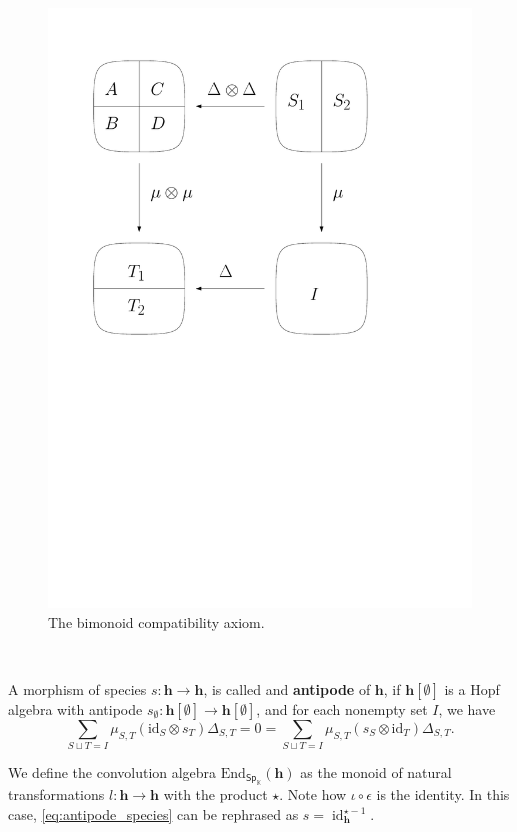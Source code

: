 \documentclass[12pt, reqno]{amsart}
\theoremstyle{definition}
\DeclareMathOperator{\id}{id}
\newcommand{\Ssk}{\mathsf{Sp}_\Kb} %
\newcommand{\Kb}{\mathbb{K}}
\newcommand{\thh}{\mathbf{h}}
\begin{document}
\begin{figure}
\includegraphics[scale=0.5]{../images/diagram_bialgebra}
\caption{The bimonoid compatibility axiom.\label{fig:bimonoid}}
\end{figure}

\


A morphism of species $s: \thh \to \thh$, is called and {\bf antipode} of $\thh$, if $\thh[\emptyset]$ is a Hopf algebra with antipode $s_\emptyset: \thh[\emptyset] \to \thh[\emptyset]$, and for each nonempty set $I$, we have
\begin{equation}\label{eq:antipode_species}
    \sum_{S \sqcup T = I} \mu_{S,T}(\text{id}_S \otimes s_T)\Delta_{S,T} = 0 = \sum_{S \sqcup T = I} \mu_{S,T}(s_S \otimes \text{id}_T)\Delta_{S,T}.
\end{equation}


We define the convolution algebra $\text{End}_{\Ssk}(\thh)$ as the monoid of natural transformations $l: \thh \to \thh$ with the product $\star$.
Note how $\iota \circ \epsilon $ is the identity.
In this case, \eqref{eq:antipode_species} can be rephrased as $s = \id_{\thh}^{\star -1}$.
\end{document}
